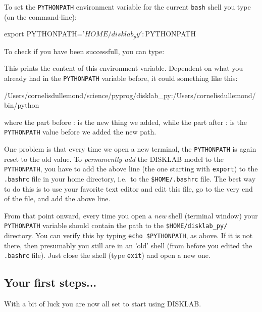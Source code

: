 \documentclass{book}
\newcommand{\code}[1]{{\small\tt #1}}
\begin{document}
To set the \code{PYTHONPATH} environment variable for the current
\code{bash} shell you type (on the command-line):
\begin{codebox}
export PYTHONPATH='$HOME/disklab_py':$PYTHONPATH
\end{codebox}
To check if you have been successfull, you can type:
This prints the content of this environment variable. Dependent on what you
already had in the \code{PYTHONPATH} variable before, it could something
like this:
\begin{codebox}
/Users/cornelisdullemond/science/pyprog/disklab_py:/Users/cornelisdullemond/bin/python
\end{codebox}
where the part before : is the new thing we added, while the part after : is
the \code{PYTHONPATH} value before we added the new path.

One problem is that every time we open a new terminal, the \code{PYTHONPATH} is
again reset to the old value. To {\em permanently add} the {\sf DISKLAB} model
to the \code{PYTHONPATH}, you have to add the above line (the one starting with
\code{export}) to the \code{.bashrc} file in your home directory, i.e.\ to the
\code{\$HOME/.bashrc} file. The best way to do this is to use your favorite
text editor and edit this file, go to the very end of the file, and add the
above line.

From that point onward, every time you open a {\em new} shell (terminal
window) your \code{PYTHONPATH} variable should contain the path to
the \code{\$HOME/disklab\_py/} directory. You can verify this by
typing \code{echo \$PYTHONPATH}, as above. If it is not there, then
presumably you still are in an 'old' shell (from before you edited the
\code{.bashrc} file). Just close the shell (type \code{exit}) and open
a new one.

\subsection{Your first steps...}
With a bit of luck you are now all set to start using {\sf DISKLAB}.
\end{document}
